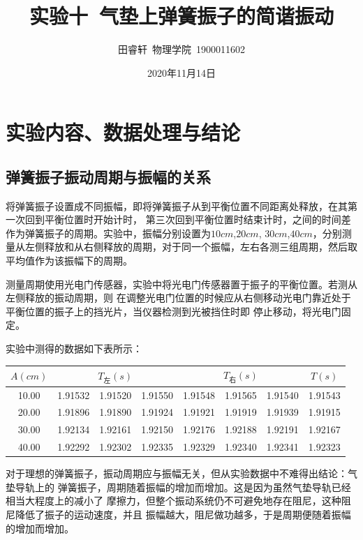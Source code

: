 \documentclass{article}
\title{\heiti 实验十\ 气垫上弹簧振子的简谐振动}
\author{\kaishu 田睿轩\ 物理学院\ 1900011602}
\date{2020年11月14日}
\begin{document}
    \maketitle

    \section{实验内容、数据处理与结论}

    \subsection{弹簧振子振动周期与振幅的关系}
    
    将弹簧振子设置成不同振幅，即将弹簧振子从到平衡位置不同距离处释放，在其第一次回到平衡位置时开始计时，
    第三次回到平衡位置时结束计时，之间的时间差作为弹簧振子的周期。实验中，振幅分别设置为$10cm$,$20cm$,
    $30cm$,$40cm$，分别测量从左侧释放和从右侧释放的周期，对于同一个振幅，左右各测三组周期，然后取平均值作为该振幅下的周期。

    测量周期使用光电门传感器，实验中将光电门传感器置于振子的平衡位置。若测从左侧释放的振动周期，则
    在调整光电门位置的时候应从右侧移动光电门靠近处于平衡位置的振子上的挡光片，当仪器检测到光被挡住时即
    停止移动，将光电门固定。

    实验中测得的数据如下表所示：

    \begin{center}
        \begin{tabular}{|c|c|c|c|c|c|c|c|}
            \hline
            $A(cm)$ & \multicolumn{3}{|c|}{$T_{\text{左}}(s)$} & \multicolumn{3}{|c|}{$T_{\text{右}}(s)$} & $T(s)$ \\
            \hline
            10.00 & 1.91532 & 1.91520 & 1.91550 & 1.91548 & 1.91565 & 1.91540 & 1.91543\\
            \hline
            20.00 & 1.91896 & 1.91890 & 1.91924 & 1.91921 & 1.91919 & 1.91939 & 1.91915\\
            \hline
            30.00 & 1.92134 & 1.92161 & 1.92150 & 1.92176 & 1.92188 & 1.92191 & 1.92167\\
            \hline
            40.00 & 1.92292 & 1.92302 & 1.92335 & 1.92329 & 1.92340 & 1.92341 & 1.92323\\
            \hline
        \end{tabular}
    \end{center}

    对于理想的弹簧振子，振动周期应与振幅无关，但从实验数据中不难得出结论：气垫导轨上的
    弹簧振子，周期随着振幅的增加而增加。这是因为虽然气垫导轨已经相当大程度上的减小了
    摩擦力，但整个振动系统仍不可避免地存在阻尼，这种阻尼降低了振子的运动速度，并且
    振幅越大，阻尼做功越多，于是周期便随着振幅的增加而增加。
\end{document}
